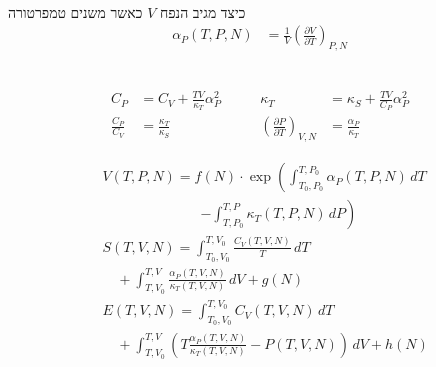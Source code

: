 \begin{cheatformula}\\
כיצד מגיב הנפח $V$ כאשר משנים טמפרטורה
    \begin{align*}
        \alpha_P\left(T,P,N\right) &= \frac{1}{V} \left( \frac{\partial V}{\partial T} \right)_{P,N}
    \end{align*}
\end{cheatformula}

\begin{cheatformula}\\
\[
\begin{aligned}
C_P &= C_V + \frac{TV}{\kappa_T} \alpha_P^2 \quad\quad &
\kappa_T &= \kappa_S + \frac{TV}{C_P} \alpha_P^2 \\[1em]
\frac{C_P}{C_V} &= \frac{\kappa_T}{\kappa_S} \quad\quad &
\left( \frac{\partial P}{\partial T} \right)_{V,N} &= \frac{\alpha_P}{\kappa_T}
\end{aligned}
\]

\begin{align*}
& V\left(T,P,N\right) = f(N) \cdot \exp\left( \int_{T_0,P_0}^{T,P_0} \alpha_P\left(T,P,N\right) \, dT \right. \\
&\quad\quad\quad\quad\quad\quad\quad\left. - \int_{T,P_0}^{T,P} \kappa_T\left(T,P,N\right) \, dP \right) \\[0.5em]
& S\left(T,V,N\right) = \int_{T_0,V_0}^{T,V_0} \frac{C_V\left(T,V,N\right)}{T} \, dT \\
&\quad + \int_{T,V_0}^{T,V} \frac{ \alpha_P\left(T,V,N\right) }{ \kappa_T\left(T,V,N\right) } \, dV + g(N) \\[0.5em]
& E\left(T,V,N\right) = \int_{T_0,V_0}^{T,V_0} C_V\left(T,V,N\right) \, dT \\
&\quad + \int_{T,V_0}^{T,V} \left( T \frac{ \alpha_P \left(T,V,N\right) }{ \kappa_T\left(T,V,N\right) } - P\left(T,V,N\right) \right) \, dV + h(N)
\end{align*}
\end{cheatformula}
